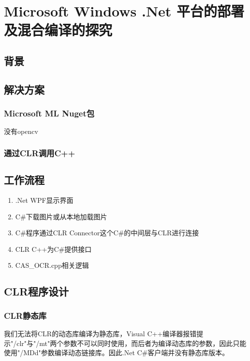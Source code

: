 \chapter{Microsoft Windows .Net 平台的部署及混合编译的探究}
\label{chapter:9dotnet}

\section{背景}

\section{解决方案}

\subsection{Microsoft ML Nuget包}

没有opencv

\subsection{通过CLR调用C++}

\section{工作流程}

\begin{enumerate}
	\item .Net WPF显示界面
	\item C\#下载图片或从本地加载图片
	\item C\#程序通过CLR Connector这个C\#的中间层与CLR进行连接
	\item CLR C++为C\#提供接口
	\item CAS\_OCR.cpp相关逻辑
\end{enumerate}

\section{CLR程序设计}

\subsection{CLR静态库}

我们无法将CLR的动态库编译为静态库，Visual C++编译器报错提示"/clr"与"/mt"两个参数不可以同时使用，而后者为编译动态库的参数，因此只能使用"/MDd"参数编译动态链接库。因此.Net C\#客户端并没有静态库版本。

